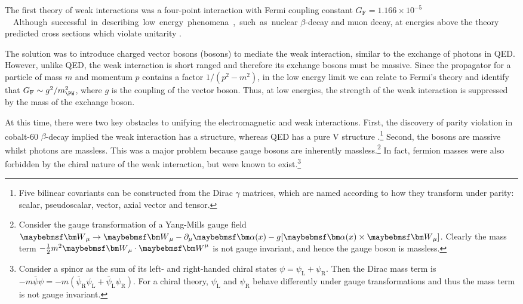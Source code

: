 
The first theory of weak interactions was a four-point interaction with Fermi coupling 
constant \unit{$G_{\text{F}} = 1.166\times 10^{-5}$}{\GeV\rpsquared}. Although successful 
in describing low energy phenomena, such as nuclear $\beta$-decay and muon decay, at 
energies above \unit{}{\GeV} the theory predicted cross sections which violate 
unitarity \cite{Aitchison}.

The solution was to introduce charged vector bosons (\PWpm bosons) to mediate the weak 
interaction, similar to the exchange of photons in QED. However, unlike QED, 
the weak interaction is short ranged and therefore its exchange bosons must be massive. 
Since the propagator for a particle of mass $m$ and momentum $p$ contains a factor 
$1 / (p^2 - m^2)$, in the low energy limit we can relate to Fermi's theory and identify 
that $G_{\text{F}} \sim g^2 / m_{\PW}^2$, where $g$ is the coupling of the vector boson. 
Thus, at low energies, the strength of the weak interaction is suppressed by the mass of the 
exchange boson.

At this time, there were two key obstacles to unifying the electromagnetic and weak 
interactions. First, the discovery of parity violation in cobalt-60 $\beta$-decay 
implied the weak interaction has a \VminusA structure, whereas QED has a pure V 
structure \cite{Wu:1957}.\footnote{
	Five bilinear covariants can be constructed from the Dirac $\gamma$ matrices, which 
	are named according to how they transform under parity: scalar, pseudoscalar, vector, 
	axial vector and tensor.
}
Second, the \PWpm bosons are massive whilst photons are massless. This was a major 
problem because gauge bosons are inherently massless.\footnote{
	Consider the gauge transformation of a Yang-Mills gauge field 
	$\bvec{W}_{\mu} \rightarrow \bvec{W}_{\mu} - \partial_{\mu} \bvec{\alpha}(x)
	- g \lbrack \bvec{\alpha}(x) \times \bvec{W}_{\mu} \rbrack$. Clearly the mass term 
	$-\tfrac{1}{2}m^2 \bvec{W}_{\mu} \cdot \bvec{W}^{\mu}$ is not gauge invariant, and 
	hence the gauge boson is massless.}
In fact, fermion masses were also forbidden by the chiral nature of the weak interaction, 
but were known to exist.\footnote{
	Consider a spinor as the sum of its left- and right-handed chiral states 
	$\psi = \psi_{\text{L}} + \psi_{\text{R}}$. Then the Dirac mass term is 
	$-m \bar{\psi} \psi = -m (\bar{\psi}_{\text{R}} \psi_{\text{L}} + 
	\bar{\psi}_{\text{L}} \psi_{\text{R}})$. For a chiral theory, $\psi_{\text{L}}$ and
	$\psi_{\text{R}}$ behave differently under gauge transformations and thus the mass 
	term is not gauge invariant.
}

